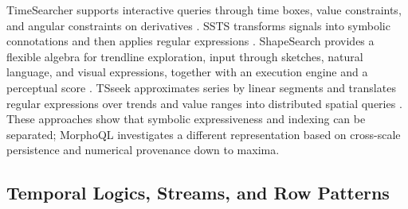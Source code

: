 \documentclass[11pt,a4paper]{article}
\begin{document}
TimeSearcher supports interactive queries through time boxes, value constraints, and angular constraints on derivatives \cite{hochheiser2004}. SSTS transforms signals into symbolic connotations and then applies regular expressions \cite{rodrigues2019}. ShapeSearch provides a flexible algebra for trendline exploration, input through sketches, natural language, and visual expressions, together with an execution engine and a perceptual score \cite{siddiqui2020}. TSseek approximates series by linear segments and translates regular expressions over trends and value ranges into distributed spatial queries \cite{litsseek2026}. These approaches show that symbolic expressiveness and indexing can be separated; MorphoQL investigates a different representation based on cross-scale persistence and numerical provenance down to maxima.

\subsection{Temporal Logics, Streams, and Row Patterns}
\end{document}

